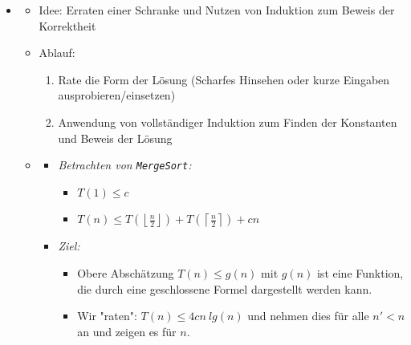 \documentclass[
    ngerman,
    color=3b,
    load_common, %
    summary,
    boxarc,
]{tuda_summary}
\begin{document}
\begin{itemize}
    \item {}
          \begin{itemize}
              \item Idee: Erraten einer Schranke und Nutzen von Induktion zum Beweis der Korrektheit
              \item Ablauf:
                    \begin{enumerate}
                        \item Rate die Form der Lösung (Scharfes Hinsehen oder kurze Eingaben ausprobieren/einsetzen)
                        \item Anwendung von vollständiger Induktion zum Finden der Konstanten und Beweis der Lösung
                    \end{enumerate}
                    \clearpage
              \item {}
                    \begin{itemize}
                        \item \textit{Betrachten von \texttt{MergeSort}:}
                              \begin{itemize}
                                  \item $T(1) \leq c$
                                  \item $T(n) \leq T(\left \lfloor \frac{n}{2} \right \rfloor) + T(\left \lceil \frac{n}{2} \right \rceil) + cn$
                              \end{itemize}

                        \item \textit{Ziel:}
                              \begin{itemize}
                                  \item[]
                                        Obere Abschätzung $T(n) \leq g(n)$ mit $g(n)$ ist eine Funktion, die durch eine
                                        geschlossene Formel dargestellt werden kann.
                                  \item[]
                                        Wir \string"raten\string": $T(n) \leq 4cn~lg(n)$ und nehmen dies für alle $n' < n$ an und
                                        zeigen es für $n$.
                              \end{itemize}


\end{itemize}
\end{itemize}
\end{itemize}
\end{document}
